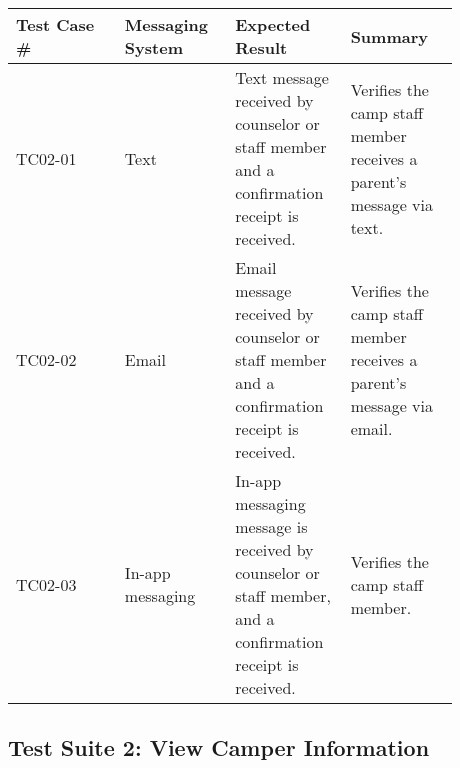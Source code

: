 \documentclass[11pt]{article}
\begin{document}
\begin{center}
\begin{longtable}{|p{0.22\linewidth}|p{0.22\linewidth}|p{0.22\linewidth}|p{0.22\linewidth}|}
	\hline
	Test Case \# & Messaging System & Expected Result & Summary\\\hline
	TC02-01 & Text & Text message received by counselor or staff member and a confirmation receipt is received. & Verifies the camp staff member receives a parent's message via text.\vspace*{1em}\\\hline
	TC02-02 & Email & Email message received by counselor or staff member and a confirmation receipt is received. & Verifies the camp staff member receives a parent's message via email. \vspace*{1em}\\	\hline
	TC02-03 & In-app messaging & In-app messaging message is received by counselor or staff member, and a confirmation receipt is received. & Verifies the camp staff member.\vspace*{1em}\\\hline
\end{longtable}
\end{center}
\clearpage


\subsection*{Test Suite 2: View Camper Information}
\end{document}
